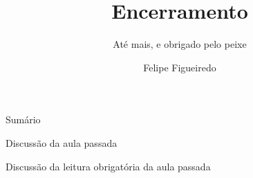 \documentclass{beamer}
\title[Encerramento] %
{Encerramento}
\subtitle
{Até mais, e obrigado pelo peixe} %
\author%
{Felipe Figueiredo}%
\institute[] %
{
}
\date%
{}
\begin{document}
\begin{frame}
  \titlepage
\end{frame}

\begin{frame}{Sumário}
  \tableofcontents
\end{frame}








\begin{frame}{Discussão da aula passada}
  \begin{block}{}
    Discussão da leitura obrigatória da aula passada
  \end{block}
\end{frame}
\end{document}
